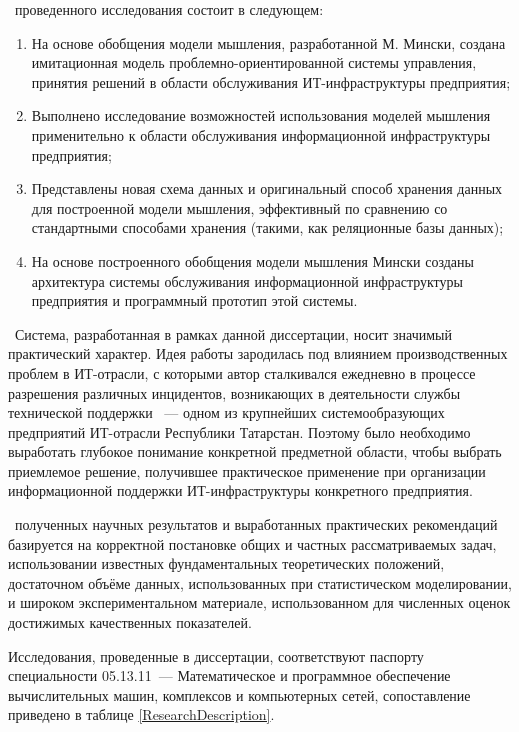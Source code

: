 \novelty\ проведенного исследования состоит в следующем:
\begin{enumerate}
  \item На основе обобщения модели мышления, разработанной М. Мински, создана имитационная модель проблемно-ориентированной системы управления, принятия решений в области обслуживания ИТ-инфраструктуры предприятия;
  \item Выполнено исследование возможностей использования моделей мышления применительно к области обслуживания информационной инфраструктуры предприятия;
  \item Представлены новая схема данных и оригинальный способ хранения данных для построенной модели мышления, эффективный по сравнению со стандартными способами хранения (такими, как реляционные базы данных);
  \item На основе построенного обобщения модели мышления Мински созданы архитектура системы обслуживания информационной инфраструктуры предприятия и программный прототип этой системы.
\end{enumerate}

\influence\ 
Система, разработанная в рамках данной диссертации, носит значимый практический характер. Идея работы зародилась под влиянием производственных проблем в ИТ-отрасли, с которыми автор сталкивался ежедневно в процессе разрешения различных инцидентов, возникающих в деятельности службы технической поддержки \icl~--- одном из крупнейших системообразующих предприятий ИТ-отрасли Республики Татарстан. Поэтому было необходимо выработать глубокое понимание конкретной предметной области, чтобы выбрать приемлемое решение, получившее практическое применение при организации информационной поддержки ИТ-инфраструктуры конкретного предприятия. \par
\reliability\ полученных научных результатов и выработанных практических рекомендаций базируется на корректной постановке общих и частных рассматриваемых задач,  использовании известных фундаментальных теоретических положений, достаточном объёме данных, использованных при статистическом моделировании, и широком экспериментальном материале, использованном для численных оценок достижимых качественных показателей. \par 
Исследования, проведенные в диссертации, соответствуют паспорту специальности 05.13.11~--- Математическое и программное обеспечение вычислительных машин, комплексов и компьютерных сетей, сопоставление приведено в таблице \ref{ResearchDescription}.

